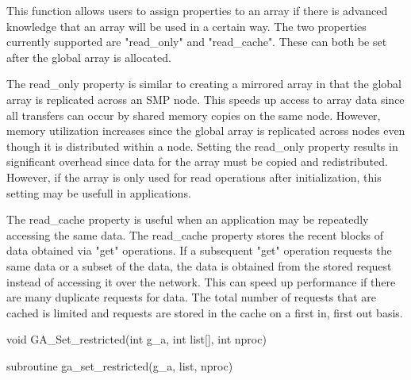 \documentclass[12pt]{article}
\begin{document}
\gcoll

\begin{desc}

This function allows users to assign properties to an array if there is advanced
knowledge that an array will be used in a certain way. The two properties
currently supported are "read_only" and "read_cache". These can both be set
after the global array is allocated.

The read_only property is similar to creating a mirrored array in that the global
array is replicated across an SMP node. This speeds up access to array data
since all transfers can occur by shared memory copies on the same node. However,
memory utilization increases since the global array is replicated across nodes even
though it is distributed within a node. Setting the read_only property results in
significant overhead since data for the array must be copied and redistributed.
However, if the array is only used for read operations after initialization, this
setting may be usefull in applications.

The read_cache property is useful when an application may be repeatedly
accessing the same data. The read_cache property stores the recent blocks of
data obtained via "get" operations. If a subsequent "get" operation requests the same data or
a subset of the data, the data is obtained from the stored request instead of 
accessing it over the network. This can speed up performance if there are many
duplicate requests for data. The total number of requests that are cached is
limited and requests are stored in the cache on a first in, first out basis.

\end{desc}



\begin{capi}
\begin{ccode}
void GA_Set_restricted(int g_a, int list[], int nproc)
\end{ccode}
\begin{funcargs}
\end{funcargs}
\end{capi}

\begin{fapi}
\begin{fcode}
subroutine ga_set_restricted(g_a, list, nproc)
\end{fcode}
\begin{funcargs}
\end{funcargs}
\end{fapi}
\end{document}
